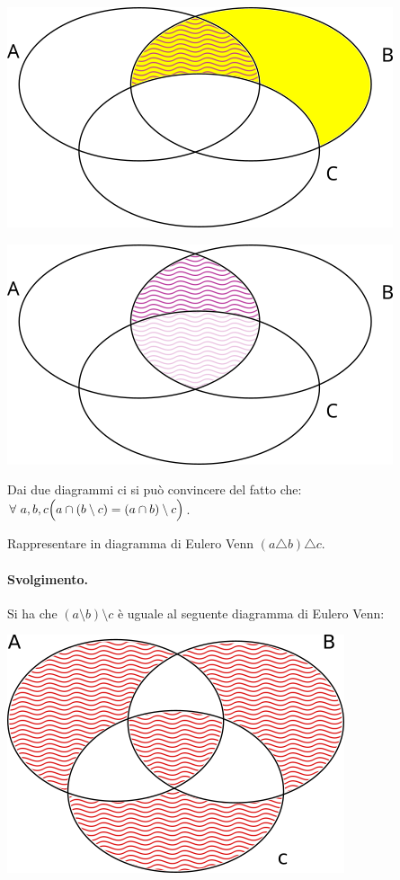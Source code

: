 \begin{center}
	\begin{minipage}{.45\textwidth}
		\centering
		\includegraphics[scale=0.5]{res/Venn2882.png}
		\label{fig:venn2283}
	\end{minipage}
	\hfil
	\begin{minipage}{.45\textwidth}
		\centering
		\includegraphics[scale=0.5]{res/Venn2882_2.png}
		\label{fig:venn2284}
	\end{minipage}
\end{center}
Dai due diagrammi ci si può convincere del fatto che: $\forall \ a,b,c \Bigl(a\cap(b \setminus c) = (a \cap b) \setminus c \Bigr)$. \hfill \blacksquare
\begin{exsbox}
	Rappresentare in diagramma di Eulero Venn $(a \triangle b) \triangle c$.
\end{exsbox}
\paragraph*{Svolgimento.}
Si ha che $(a \setminus b)\setminus c$ è uguale al seguente diagramma di Eulero Venn:
\begin{center}
	\includegraphics[scale=0.6]{res/diff3sim.png}
\end{center}

